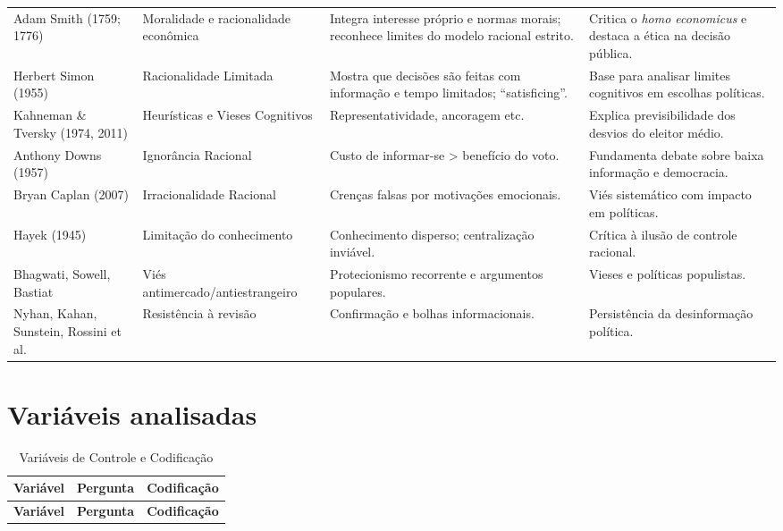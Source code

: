 \begin{apendicesenv}
{\begin{longtable}{p{} p{} p{} p{}}
 Adam Smith (1759; 1776) & Moralidade e racionalidade econômica & Integra interesse próprio e normas morais; reconhece limites do modelo racional estrito. & Critica o \textit{homo economicus} e destaca a ética na decisão pública. \\
 Herbert Simon (1955) & Racionalidade Limitada & Mostra que decisões são feitas com informação e tempo limitados; “satisficing”. & Base para analisar limites cognitivos em escolhas políticas. \\
 Kahneman \& Tversky (1974, 2011) & Heurísticas e Vieses Cognitivos & Representatividade, ancoragem etc. & Explica previsibilidade dos desvios do eleitor médio. \\
 Anthony Downs (1957) & Ignorância Racional & Custo de informar-se > benefício do voto. & Fundamenta debate sobre baixa informação e democracia. \\
 Bryan Caplan (2007) & Irracionalidade Racional & Crenças falsas por motivações emocionais. & Viés sistemático com impacto em políticas. \\
 Hayek (1945) & Limitação do conhecimento & Conhecimento disperso; centralização inviável. & Crítica à ilusão de controle racional. \\
 Bhagwati, Sowell, Bastiat & Viés antimercado/antiestrangeiro & Protecionismo recorrente e argumentos populares. & Vieses e políticas populistas. \\
 Nyhan, Kahan, Sunstein, Rossini et al. & Resistência à revisão & Confirmação e bolhas informacionais. & Persistência da desinformação política. \\
 \end{longtable}
}

\chapter{Variáveis analisadas}
\label{anexo:A}

\renewcommand{\arraystretch}{1.3}

\begin{longtable}{|>{\raggedright\arraybackslash}p{4cm} 
                  |>{\raggedright\arraybackslash}p{8cm} 
                  |>{\raggedright\arraybackslash}p{4cm}|}
    \caption{Variáveis de Controle e Codificação}
    \label{tab:control_variables} \\
    \hline
    \textbf{Variável} & \textbf{Pergunta} & \textbf{Codificação} \\
    \hline
    \endfirsthead

    \hline
    \textbf{Variável} & \textbf{Pergunta} & \textbf{Codificação} \\
    \hline
    \endhead


\end{longtable}
\end{apendicesenv}
